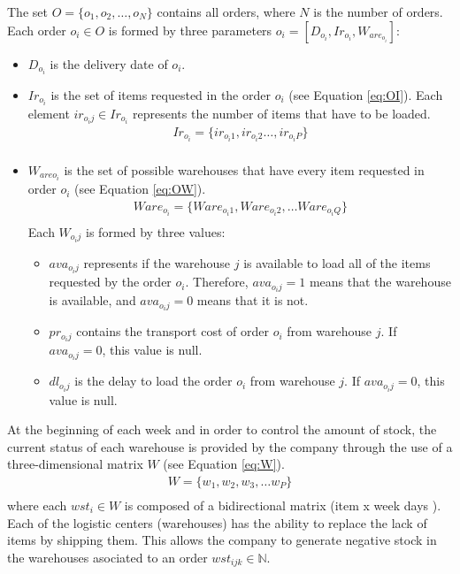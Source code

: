 \documentclass[letterpaper]{article} %
\begin{document}
The set $O = \{o_1, o_2, \dots, o_N \}$ contains all orders, where $N$ is the number of orders. Each order $o_i \in O$ is formed by three parameters $o_i =[D_{o_i},Ir_{o_i},W_{are_{o_i}}]$:
\begin{itemize}
    \item $D_{o_i}$ is the delivery date of $o_i$.
    \item $Ir_{o_i}$ is the set of items requested in the order $o_i$ (see Equation \ref{eq:OI}). Each element $ir_{o_{i}j} \in Ir_{o_i}$ represents the number of items that have to be loaded.
    \begin{equation}\label{eq:OI}
        \begin{aligned}
            Ir_{o_{i}} = \{ ir_{o_{i}1}, ir_{o_{i}2} \dots, ir_{o_{i}P} \} \\
        \end{aligned}
    \end{equation}
    \item $W_{are{o_i}}$ is the set of possible warehouses that have every item requested in order $o_i$ (see Equation \ref{eq:OW}).
    \begin{equation} \label{eq:OW}
        \begin{aligned}
            Ware_{o_i} = \{ Ware_{o_{i}1}, Ware_{o_{i}2}, \dots Ware_{o_{i}Q} \}\\
        \end{aligned}
    \end{equation}
    Each $W_{o_{i}j}$ is formed by three values:
    \begin{itemize}
        \item $ava_{o_{i}j}$ represents if the warehouse $j$ is available to load all of the items requested by the order $o_i$. Therefore, $ava_{o_{i}j}=1$  means that the warehouse is available, and $ava_{o_{i}j}=0$ means that it is not.
        \item $pr_{o_{i}j}$ contains the transport cost of order $o_i$ from warehouse $j$. If $ava_{o_{i}j}=0$, this value is null.
        \item $dl_{o_{i}j}$ is the delay to load the order $o_i$ from warehouse $j$. If $ava_{o_{i}j}=0$, this value is null.
    \end{itemize}
\end{itemize}

At the beginning of each week and in order to control the amount of stock, the current status of each warehouse is provided by the company through the use of a three-dimensional matrix $W$ (see Equation \ref{eq:W}).
\begin{equation}
    \begin{aligned}\label{eq:W}
        W = \{w_1, w_2, w_3, \dots w_P \}\\
    \end{aligned}
\end{equation}
where each $wst_i \in W$ is composed of a bidirectional matrix (item x week days ). Each of the logistic centers (warehouses) has the ability to replace the lack of items by shipping them. This allows the company to generate negative stock in the warehouses asociated to an order $wst_{ijk} \in \mathbb{N} $.
\end{document}
